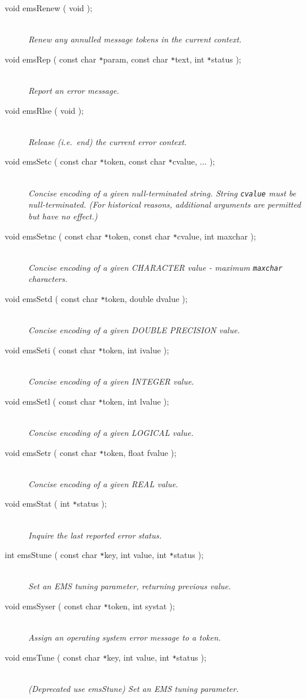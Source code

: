 \documentclass[twoside,11pt]{starlink}
\providecommand{\listline}{\hspace{1pt}\\}
\begin{document}
\begin {description}
\item[void emsRenew ( void );] \listline
\textit{Renew any annulled message tokens in the current context.}

\item[void emsRep ( const char \texttt{*}param, const char \texttt{*}text,
int \texttt{*}status );] \listline
\textit{Report an error message.}

\item[void emsRlse ( void );] \listline
\textit{Release (i.e.\ end) the current error context.}

\item[void emsSetc ( const char \texttt{*}token,
const char \texttt{*}cvalue, ... );] \listline
\textit{Concise encoding of a given null-terminated string. String
\texttt{cvalue} must be null-terminated. (For historical
reasons, additional arguments are permitted but have no effect.)}

\item[void emsSetnc ( const char \texttt{*}token, const char \texttt{*}cvalue,
int maxchar );] \listline
\textit{Concise encoding of a given CHARACTER value - maximum \texttt{maxchar}
characters.}

\item[void emsSetd ( const char \texttt{*}token, double dvalue );] \listline
\textit{Concise encoding of a given DOUBLE PRECISION value.}

\item[void emsSeti ( const char \texttt{*}token, int ivalue );] \listline
\textit{Concise encoding of a given INTEGER value.}

\item[void emsSetl ( const char \texttt{*}token, int lvalue );] \listline
\textit{Concise encoding of a given LOGICAL value.}

\item[void emsSetr ( const char \texttt{*}token, float fvalue );] \listline
\textit{Concise encoding of a given REAL value.}

\item[void emsStat ( int \texttt{*}status );] \listline
\textit{Inquire the last reported error status.}

\item[int emsStune ( const char \texttt{*}key, int value,
int \texttt{*}status );] \listline
\textit{Set an EMS tuning parameter, returning previous value.}

\item[void emsSyser ( const char \texttt{*}token, int systat );] \listline
\textit{Assign an operating system error message to a token.}

\item[void emsTune ( const char \texttt{*}key, int value,
int \texttt{*}status );] \listline
\textit{(Deprecated use emsStune) Set an EMS tuning parameter.}

\end {description}
\end{document}
